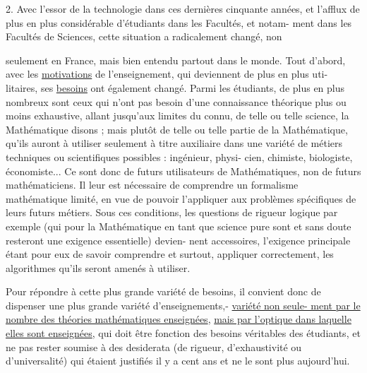 \documentclass[11pt]{article}
\newcommand{\scanpage}[1]{\par\bigskip\noindent{\small\sffamily[scan #1]}\par}
\newcommand{\mspage}[1]{{\small\sffamily[p.\,#1]}}
\newcommand{\uline}[1]{\underline{#1}}
\begin{document}
2. Avec l'essor de la technologie dans ces dernières cinquante années, et
l'afflux de plus en plus considérable d'étudiants dans les Facultés, et notam-%
ment dans les Facultés de Sciences, cette situation a radicalement changé, non

\mspage{254}

\clearpage
\scanpage{119/255}
\mspage{2}

seulement en France, mais bien entendu partout dans le monde. Tout d'abord,
avec les \uline{motivations} de l'enseignement, qui deviennent de plus en plus uti-%
litaires, ses \uline{besoins} ont également changé. Parmi les étudiants, de plus en
plus nombreux sont ceux qui n'ont pas besoin d'une connaissance théorique plus
ou moins exhaustive, allant jusqu'aux limites du connu, de telle ou telle
science, la Mathématique disons ; mais plutôt de telle ou telle partie de la
Mathématique, qu'ils auront à utiliser seulement à titre auxiliaire dans une
variété de métiers techniques ou scientifiques possibles : ingénieur, physi-%
cien, chimiste, biologiste, économiste... Ce sont donc de futurs utilisateurs
de Mathématiques, non de futurs mathématiciens. Il leur est nécessaire de
comprendre un formalisme mathématique limité, en vue de pouvoir l'appliquer
aux problèmes spécifiques de leurs futurs métiers. Sous ces conditions, les
questions de rigueur logique par exemple (qui pour la Mathématique en tant
que science pure sont et sans doute resteront une exigence essentielle) devien-%
nent accessoires, l'exigence principale étant pour eux de savoir comprendre
et surtout, appliquer correctement, les algorithmes qu'ils seront amenés à
utiliser.

Pour répondre à cette plus grande variété de besoins, il convient
donc de dispenser une plus grande variété d'enseignements,- \uline{variété non seule-%
ment par le nombre des théories mathématiques enseignées}, \uline{mais par l'optique
dans laquelle elles sont enseignées}, qui doit être fonction des besoins
véritables des étudiants, et ne pas rester soumise à des desiderata (de
rigueur, d'exhaustivité ou d'universalité) qui étaient justifiés il y a cent
ans et ne le sont plus aujourd'hui.
\end{document}
